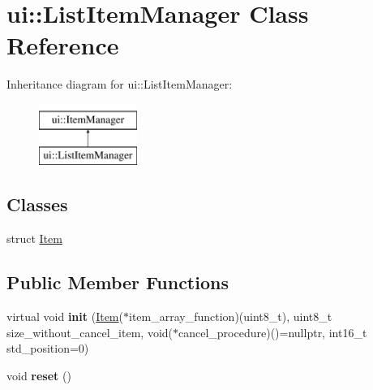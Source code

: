 \hypertarget{classui_1_1_list_item_manager}{}\section{ui\+::List\+Item\+Manager Class Reference}
\label{classui_1_1_list_item_manager}
Inheritance diagram for ui\+::List\+Item\+Manager\+:\begin{figure}[H]
\begin{center}
\leavevmode
\includegraphics[height=2.000000cm]{classui_1_1_list_item_manager}
\end{center}
\end{figure}
\subsection*{Classes}
\begin{DoxyCompactItemize}
\item 
struct \mbox{\hyperlink{structui_1_1_list_item_manager_1_1_item}{Item}}
\end{DoxyCompactItemize}
\subsection*{Public Member Functions}
\begin{DoxyCompactItemize}
\item 
\mbox{\label{classui_1_1_list_item_manager_acf50c4859c92991594a3a2a5cab3a749}} 
virtual void {\bfseries init} (\mbox{\hyperlink{structui_1_1_list_item_manager_1_1_item}{Item}}($\ast$item\+\_\+array\+\_\+function)(uint8\+\_\+t), uint8\+\_\+t size\+\_\+without\+\_\+cancel\+\_\+item, void($\ast$cancel\+\_\+procedure)()=nullptr, int16\+\_\+t std\+\_\+position=0)
\item 
\mbox{\label{classui_1_1_list_item_manager_a3e1714950373e2ab1f6036d1f59712dd}} 
void {\bfseries reset} ()
\end{DoxyCompactItemize}
